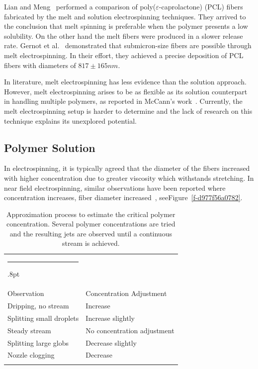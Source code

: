 \documentclass[5p,,preprint,12pt,twocolumn]{elsarticle}
\makeatletter
\def\hlinewd#1{%
  \noalign{\ifnum0=`}\fi\hrule \@height #1%
  \futurelet\reserved@a\@xhline}
\def\tbltoprule{\hlinewd{.8pt}\\[-12pt]}
\def\tblbottomrule{\noalign{\vspace*{6pt}}\hline\noalign{\vspace*{2pt}}}
\def\tblmidrule{\noalign{\vspace*{6pt}}\hline\noalign{\vspace*{2pt}}}
\makeatother
\begin{document}
Lian and Meng\unskip~\cite{527120:13445754} performed a comparison of poly(\ensuremath{\varepsilon }-caprolactone) (PCL) fibers fabricated by the melt and solution electrospinning techniques. They arrived to the conclusion that melt spinning is preferable when the polymer presents a low solubility. On the other hand the melt fibers were produced in a slower release rate. Gernot et al.\unskip~\cite{527120:13534159} demonstrated that submicron-size fibers are possible through melt electrospinning. In their effort, they achieved a precise deposition of PCL fibers with diameters of $817 \pm 165 nm $. 

In literature, melt electrospinning has less evidence than the solution approach. However, melt electrospinning arises to be as flexible as its solution counterpart in handling multiple polymers, as reported in McCann's work\unskip~\cite{527120:13534572}. Currently, the melt electrospinning setup is harder to determine and the lack of research on this technique explains its unexplored potential.



\subsection{Polymer Solution}In electrospinning, it is typically agreed that the diameter of the fibers increased with higher concentration due to greater viscosity which withstands stretching. In near field electrospinning, similar observations have been reported where concentration increases, fiber diameter increased\unskip~\cite{527120:11974306,527120:11974329}, seeFigure~\ref{f-d977f56a0782}.
\begin{table}[!htbp]
\caption{{Approximation process to estimate the critical polymer concentration. Several polymer concentrations are tried and the resulting jets are observed until a continuous stream is achieved.} }
\label{tw-be3662f66502}
\def\arraystretch{1}
\ignorespaces 
\centering 
\begin{tabulary}{\linewidth}{LL}
\tbltoprule Observation & Concentration Adjustment\\
\tblmidrule 
Dripping, no stream &
  Increase\\
Splitting small droplets &
  Increase slightly\\
Steady stream &
  No concentration adjustment\\
Splitting large globs &
  Decrease slightly\\
Nozzle clogging &
  Decrease\\
\tblbottomrule 
\end{tabulary}\par 
\end{table}
\end{document}
